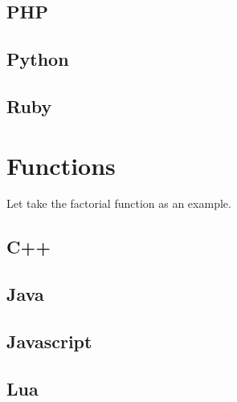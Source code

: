 \documentclass{KBook}
\begin{document}


\subsection{PHP}



\subsection{Python}



\subsection{Ruby}



\section{Functions}
Let take the factorial function as an example. 

\subsection{C++}


%

\subsection{Java}



\subsection{Javascript}



\subsection{Lua}
\end{document}
